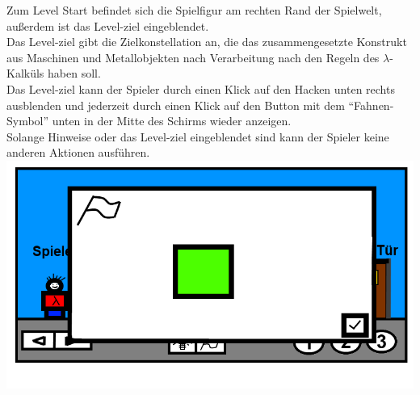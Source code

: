 \documentclass{scrartcl}
\begin{document}
\begin{description}
	\begin{enumerate}
		\begin{minipage}{1\textwidth}
			\item \label{Levelaufbau:Levelstart	} Zum Level Start befindet sich die Spielfigur am rechten Rand der Spielwelt,\\
			außerdem ist das Level-ziel eingeblendet.\\
			Das Level-ziel gibt die Zielkonstellation an, die das zusammengesetzte Konstrukt aus Maschinen und Metallobjekten nach Verarbeitung nach den Regeln des $\lambda$-Kalküls haben soll.\\
			Das Level-ziel kann der Spieler durch einen Klick auf den Hacken unten rechts ausblenden und jederzeit durch einen Klick auf den Button mit dem ``Fahnen-Symbol'' unten in der Mitte des Schirms wieder anzeigen.\\ Solange Hinweise oder das Level-ziel eingeblendet sind kann der Spieler keine anderen Aktionen ausführen.\\
			\includegraphics[scale=0.5]{assets/Levelziel}
		\end{minipage}
		

\end{enumerate}
\end{description}
\end{document}

